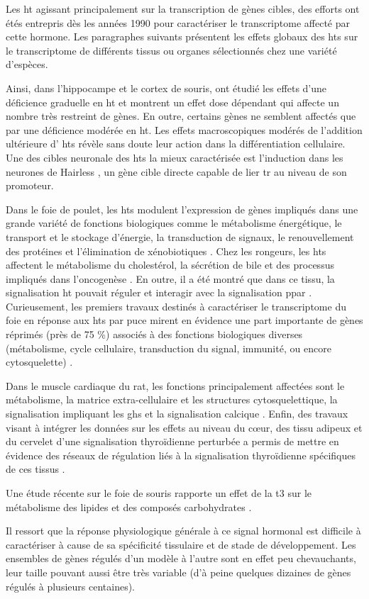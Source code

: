 \documentclass[../main.tex]{subfiles}
\begin{document}
Les \gls{ht} agissant principalement sur la transcription de gènes cibles, des efforts ont étés entrepris dès les années 1990 pour caractériser le transcriptome affecté par cette hormone.
Les paragraphes suivants présentent les effets globaux des \glspl{ht} sur le transcriptome de différents tissus ou organes sélectionnés chez une variété d'espèces.
\par
Ainsi, dans l'hippocampe et le cortex de souris, \citet{Chatonnet2011} ont étudié les effets d'une déficience graduelle en \gls{ht} et montrent un effet dose dépendant qui affecte un nombre très restreint de gènes.
En outre, certains gènes ne semblent affectés que par une déficience modérée en \gls{ht}.
Les effets macroscopiques modérés de l'addition ultérieure d' \glspl{ht} révèle sans doute leur action dans la différentiation cellulaire.
Une des cibles neuronale des \glspl{ht} la mieux caractérisée est l'induction dans les neurones de Hairless \citep{Thompson1996}, un gène cible directe capable de lier \gls{tr} au niveau de son promoteur.
\par
Dans le foie de poulet, les \glspl{ht} modulent l'expression de gènes impliqués dans une grande variété de fonctions biologiques comme le métabolisme énergétique, le transport et le stockage d'énergie, la transduction de signaux, le renouvellement des protéines et l'élimination de xénobiotiques \citep{Wang2007}.
Chez les rongeurs, les \glspl{ht} affectent le métabolisme du cholestérol, la sécrétion de bile et des processus impliqués dans l'oncogenèse \citep{Ventura-Holman2007}.
En outre, il a été montré que dans ce tissu, la signalisation \gls{ht} pouvait réguler et interagir avec la signalisation \gls{ppar} \citep{Weitzel2003}.
Curieusement, les premiers travaux destinés à caractériser le transcriptome du foie en réponse aux  \glspl{ht} par puce mirent en évidence une part importante de gènes réprimés (près de 75 \%) associés à des fonctions biologiques diverses (métabolisme, cycle cellulaire, transduction du signal, immunité, ou encore cytosquelette) \citep{Feng2000}.
\par
Dans le muscle cardiaque du rat, les fonctions principalement affectées sont le métabolisme, la matrice extra-cellulaire et les structures cytosquelettique, la signalisation impliquant les \glspl{gh} et la signalisation calcique \citep{De2004}.
Enfin, des travaux visant à intégrer les données sur les effets au niveau du cœur, des tissu adipeux et du cervelet d'une signalisation thyroïdienne perturbée a permis de mettre en évidence des réseaux de régulation liés à la signalisation thyroïdienne spécifiques de ces tissus \citep{Miller2004}.
\par
Une étude récente sur le foie de souris rapporte un effet de la \gls{t3} sur le métabolisme des lipides et des composés carbohydrates \citep{Ramadoss2014}.
\par
Il ressort que la réponse physiologique générale à ce signal hormonal est difficile à caractériser à cause de sa spécificité tissulaire et de stade de développement.
Les ensembles de gènes régulés d'un modèle à l'autre sont en effet peu chevauchants, leur taille pouvant aussi être très variable (d'à peine quelques dizaines de gènes régulés à plusieurs centaines).

\end{document}
